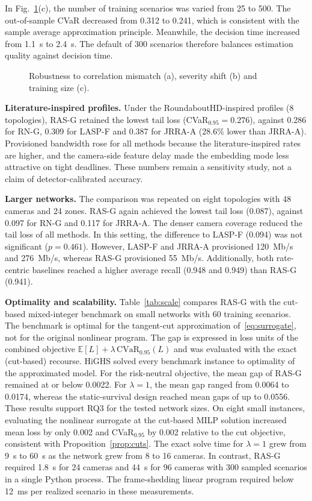\documentclass[letterpaper,journal]{IEEEtran}
\begin{document}
In Fig.~\ref{fig:robust}(c), the number of training scenarios was varied from 25 to 500. The out-of-sample CVaR decreased from 0.312 to 0.241, which is consistent with the sample average approximation principle. Meanwhile, the decision time increased from 1.1~s to 2.4~s. The default of 300 scenarios therefore balances estimation quality against decision time.

\begin{figure}[t]
\centering

\caption{Robustness to correlation mismatch (a), severity shift (b) and training size (c).}
\label{fig:robust}
\end{figure}

\textbf{Literature-inspired profiles.} Under the RoundaboutHD-inspired profiles (8 topologies), RAS-G retained the lowest tail loss (CVaR$_{0.95}=0.276$), against 0.286 for RN-G, 0.309 for LASP-F and 0.387 for JRRA-A (28.6\% lower than JRRA-A). Provisioned bandwidth rose for all methods because the literature-inspired rates are higher, and the camera-side feature delay made the embedding mode less attractive on tight deadlines. These numbers remain a sensitivity study, not a claim of detector-calibrated accuracy.

\textbf{Larger networks.} The comparison was repeated on eight topologies with 48 cameras and 24 zones. RAS-G again achieved the lowest tail loss (0.087), against 0.097 for RN-G and 0.117 for JRRA-A. The denser camera coverage reduced the tail loss of all methods. In this setting, the difference to LASP-F (0.094) was not significant ($p=0.461$). However, LASP-F and JRRA-A provisioned 120~Mb/s and 276~Mb/s, whereas RAS-G provisioned 55~Mb/s. Additionally, both rate-centric baselines reached a higher average recall (0.948 and 0.949) than RAS-G (0.941).

\textbf{Optimality and scalability.} Table~\ref{tab:scale} compares RAS-G with the cut-based mixed-integer benchmark on small networks with 60 training scenarios. The benchmark is optimal for the tangent-cut approximation of~\eqref{eq:surrogate}, not for the original nonlinear program. The gap is expressed in loss units of the combined objective $\mathbb E[L]+\lambda\,\mathrm{CVaR}_{0.95}(L)$ and was evaluated with the exact (cut-based) recourse. HiGHS solved every benchmark instance to optimality of the approximated model. For the risk-neutral objective, the mean gap of RAS-G remained at or below 0.0022. For $\lambda=1$, the mean gap ranged from 0.0064 to 0.0174, whereas the static-survival design reached mean gaps of up to 0.0556. These results support RQ3 for the tested network sizes. On eight small instances, evaluating the nonlinear surrogate at the cut-based MILP solution increased mean loss by only 0.002 and CVaR$_{0.95}$ by 0.002 relative to the cut objective, consistent with Proposition~\ref{prop:cuts}.  The exact solve time for $\lambda=1$ grew from 9~s to 60~s as the network grew from 8 to 16 cameras. In contrast, RAS-G required 1.8~s for 24 cameras and 44~s for 96 cameras with 300 sampled scenarios in a single Python process. The frame-shedding linear program required below 12~ms per realized scenario in these measurements.
\end{document}
